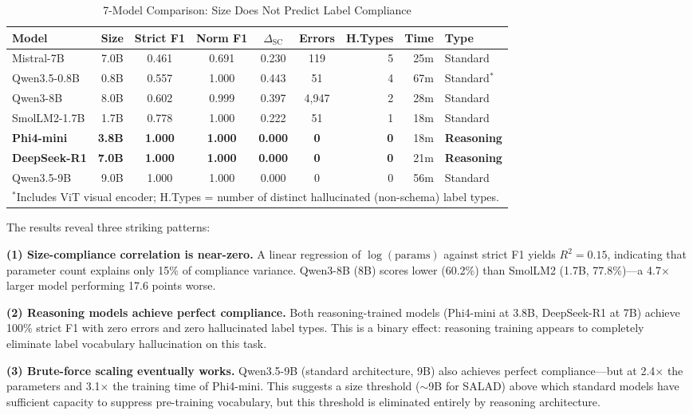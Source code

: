 \documentclass[review,3p]{elsarticle}
\begin{document}
\begin{table}[t]
\centering
\caption{7-Model Comparison: Size Does Not Predict Label Compliance}
\label{tab:main}
\begin{tabular}{lrccccrrl}
\toprule
\textbf{Model} & \textbf{Size} & \textbf{Strict F1} & \textbf{Norm F1} & \textbf{$\Delta_\text{SC}$} & \textbf{Errors} & \textbf{H.Types} & \textbf{Time} & \textbf{Type} \\
\midrule
Mistral-7B & 7.0B & 0.461 & 0.691 & 0.230 & 119 & 5 & 25m & Standard \\
Qwen3.5-0.8B & 0.8B & 0.557 & 1.000 & 0.443 & 51 & 4 & 67m & Standard$^*$ \\
Qwen3-8B & 8.0B & 0.602 & 0.999 & 0.397 & 4,947 & 2 & 28m & Standard \\
SmolLM2-1.7B & 1.7B & 0.778 & 1.000 & 0.222 & 51 & 1 & 18m & Standard \\
\textbf{Phi4-mini} & \textbf{3.8B} & \textbf{1.000} & \textbf{1.000} & \textbf{0.000} & \textbf{0} & \textbf{0} & 18m & \textbf{Reasoning} \\
\textbf{DeepSeek-R1} & \textbf{7.0B} & \textbf{1.000} & \textbf{1.000} & \textbf{0.000} & \textbf{0} & \textbf{0} & 21m & \textbf{Reasoning} \\
Qwen3.5-9B & 9.0B & 1.000 & 1.000 & 0.000 & 0 & 0 & 56m & Standard \\
\bottomrule
\multicolumn{9}{l}{\scriptsize $^*$Includes ViT visual encoder; H.Types = number of distinct hallucinated (non-schema) label types.}
\end{tabular}
\end{table}

The results reveal three striking patterns:

\textbf{(1) Size-compliance correlation is near-zero.} A linear regression of $\log(\text{params})$ against strict F1 yields $R^2 = 0.15$, indicating that parameter count explains only 15\% of compliance variance. Qwen3-8B (8B) scores lower (60.2\%) than SmolLM2 (1.7B, 77.8\%)---a 4.7$\times$ larger model performing 17.6 points worse.

\textbf{(2) Reasoning models achieve perfect compliance.} Both reasoning-trained models (Phi4-mini at 3.8B, DeepSeek-R1 at 7B) achieve 100\% strict F1 with zero errors and zero hallucinated label types. This is a binary effect: reasoning training appears to completely eliminate label vocabulary hallucination on this task.

\textbf{(3) Brute-force scaling eventually works.} Qwen3.5-9B (standard architecture, 9B) also achieves perfect compliance---but at 2.4$\times$ the parameters and 3.1$\times$ the training time of Phi4-mini. This suggests a size threshold ($\sim$9B for SALAD) above which standard models have sufficient capacity to suppress pre-training vocabulary, but this threshold is eliminated entirely by reasoning architecture.
\end{document}
